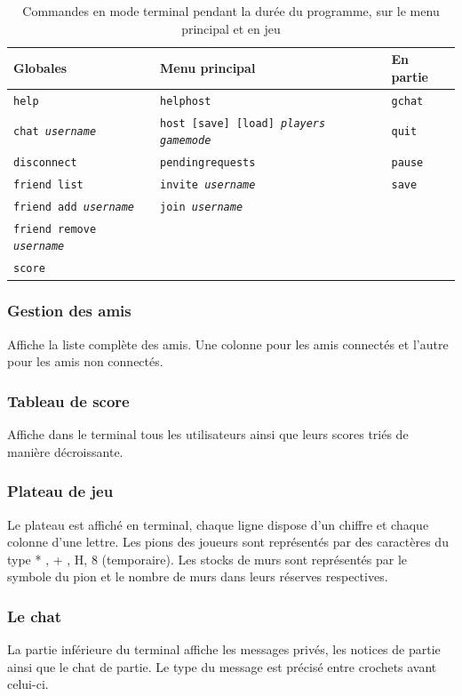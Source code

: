 \documentclass[a4paper,10pt]{article}
\newcommand{\cmd}{\texttt}
\begin{document}
\begin{table}[H]
\begin{tabular}{|p{5cm}|p{8cm}|p{3cm}|}
\hline
\textbf{Globales} & \textbf{Menu principal} & \textbf{En partie} \\
	\hline \cmd{help} & \cmd{helphost} & \cmd{gchat} \\
	\hline \cmd{chat \textit{username}} & \cmd{host [save] [load] \textit{players} \textit{gamemode}
} & \cmd{quit} \\
	\hline \cmd{disconnect} & \cmd{pendingrequests}  & \cmd{pause} \\
	\hline \cmd{friend list} & \cmd{invite \textit{username}}& \cmd{save} \\
	\hline \cmd{friend add \textit{username}} & \cmd{join \textit{username}} & \cmd{} \\
	\hline \cmd{friend remove \textit{username}} & \cmd{} & \cmd{} \\
	\hline \cmd{score} & \cmd{} & \cmd{} \\
	\hline
\end{tabular}
	\centering
	\caption{Commandes en mode terminal pendant la durée du programme, sur le menu principal et en jeu}
\end{table}





\subsubsection{Gestion des amis}
Affiche la liste complète des amis. Une colonne pour les amis connectés et l'autre pour les amis non connectés.
\subsubsection{Tableau de score}
Affiche dans le terminal tous les utilisateurs ainsi que leurs scores triés de manière décroissante.
\subsubsection{Plateau de jeu}
Le plateau est affiché en terminal, chaque ligne dispose d'un chiffre et chaque colonne d'une lettre. Les pions des joueurs sont représentés par des caractères du type * , + , H, 8 (temporaire). Les stocks de murs sont représentés par le symbole du pion et le nombre de murs dans leurs réserves respectives.
\subsubsection{Le chat}
La partie inférieure du terminal affiche les messages privés, les notices de partie ainsi que le chat de partie.
Le type du message est précisé entre crochets avant celui-ci.
\end{document}
